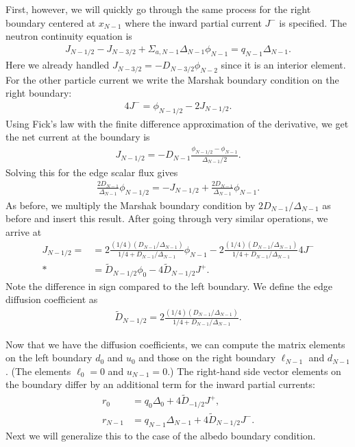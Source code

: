 First, however, we will quickly go through the same process for the right boundary centered at $x_{N-1}$ where the inward partial current $J^-$ is specified. The neutron continuity equation is
\begin{align}
  J_{N-1/2} - J_{N-3/2} + \Sigma_{a,N-1} \Delta_{N-1} \phi_{N-1} = q_{N-1} \Delta_{N-1} .
\end{align}
Here we already handled $J_{N-3/2} = -D_{N-3/2} \phi_{N-2}$ since it is an interior element. For the other particle current we write the Marshak boundary condition on the right boundary:
\begin{align}
  4 J^- = \phi_{N-1/2} - 2 J_{N-1/2} .
\end{align}
Using Fick's law with the finite difference approximation of the derivative, we get the net current at the boundary is
\begin{align}
  J_{N-1/2} = -D_{N-1} \frac{ \phi_{N-1/2} - \phi_{N-1} }{ \Delta_{N-1} / 2 } .
\end{align}
Solving this for the edge scalar flux gives
\begin{align}
   \frac{ 2 D_{N-1} }{ \Delta_{N-1} } \phi_{N-1/2} = -J_{N-1/2} + \frac{ 2 D_{N-1} }{ \Delta_{N-1} } \phi_{N-1} .
\end{align}
As before, we multiply the Marshak boundary condition by $2 D_{N-1}/\Delta_{N-1}$ as before and insert this result. After going through very similar operations, we arrive at
\begin{align}
  J_{N-1/2} =   &= 2 \frac{ ( 1/4 ) ( D_{N-1} / \Delta_{N-1} )  }{ 1/4 + D_{N-1} / \Delta_{N-1} } \phi_{N-1} - 2 \frac{ ( 1/4 ) ( D_{N-1} / \Delta_{N-1} )  }{ 1/4 + D_{N-1} / \Delta_{N-1} }  4 J^-  \nonumber \\*
  &= \widetilde{D}_{N-1/2} \phi_0 - 4 \widetilde{D}_{N-1/2} J^+ .
\end{align}
Note the difference in sign compared to the left boundary. We define the edge diffusion coefficient as
\begin{align}
  \widetilde{D}_{N-1/2} = 2 \frac{ ( 1/4 ) ( D_{N-1} / \Delta_{N-1} )  }{ 1/4 + D_{N-1} / \Delta_{N-1} }. \label{Eq:neutronics_finiteDifference_EdgeDiffusionCoefficient_RightVacuum}
\end{align}

Now that we have the diffusion coefficients, we can compute the matrix elements on the left boundary $d_0$ and $u_0$ and those on the right boundary $\ell_{N-1}$ and $d_{N-1}$. (The elements $\ell_0 = 0$ and $u_{N-1} = 0$.) The right-hand side vector elements on the boundary differ by an additional term for the inward partial currents:
\begin{subequations}
\begin{align}
   r_0 		&= q_0 \Delta_0 + 4 \widetilde{D}_{-1/2} J^+ , \\
   r_{N-1}	&= q_{N-1} \Delta_{N-1} + 4 \widetilde{D}_{N-1/2} J^- . 
\end{align}
\end{subequations}
Next we will generalize this to the case of the albedo boundary condition.

